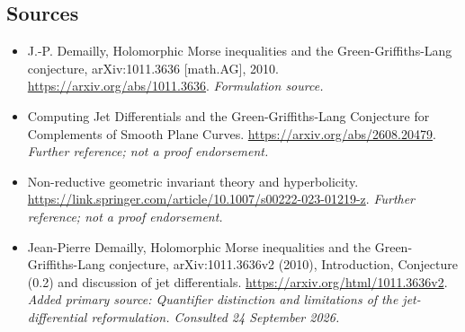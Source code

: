 \documentclass[11pt]{article}
\begin{document}
\subsection{Sources}
\begin{itemize}
\item[S1]J.-P. Demailly, Holomorphic Morse inequalities and the Green-Griffiths-Lang conjecture, arXiv:1011.3636 [math.AG], 2010.
\url{https://arxiv.org/abs/1011.3636}.
\textit{Formulation source.}
\item[S2]Computing Jet Differentials and the Green-Griffiths-Lang Conjecture for Complements of Smooth Plane Curves.
\url{https://arxiv.org/abs/2608.20479}.
\textit{Further reference; not a proof endorsement.}
\item[S3]Non-reductive geometric invariant theory and hyperbolicity.
\url{https://link.springer.com/article/10.1007/s00222-023-01219-z}.
\textit{Further reference; not a proof endorsement.}
\item[E1]Jean-Pierre Demailly, Holomorphic Morse inequalities and the Green-Griffiths-Lang conjecture, arXiv:1011.3636v2 (2010), Introduction, Conjecture (0.2) and discussion of jet differentials.
\url{https://arxiv.org/html/1011.3636v2}.
\textit{Added primary source: Quantifier distinction and limitations of the jet-differential reformulation. Consulted 24 September 2026.}
\end{itemize}
\end{document}
